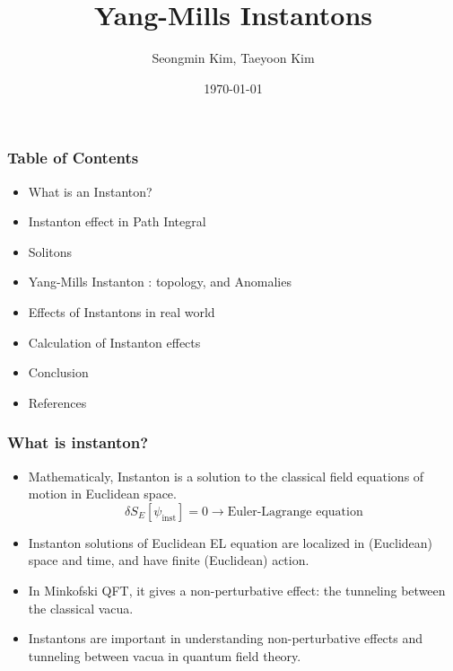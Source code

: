 \documentclass[10pt]{beamer}
\title{Yang-Mills Instantons}
\author{Seongmin Kim, Taeyoon Kim}
\institute{SNU}
\date{\today}
\begin{document}
\frame{\titlepage}

\begin{frame}
\frametitle{Table of Contents}
\begin{itemize}
\item What is an Instanton?
\item Instanton effect in Path Integral
\item Solitons
\item Yang-Mills Instanton : topology, and Anomalies
\item Effects of Instantons in real world
\item Calculation of Instanton effects
\item Conclusion
\item References
\end{itemize}
\end{frame}

\begin{frame}
\frametitle{What is instanton?}
\begin{itemize}
\item Mathematicaly, Instanton is a solution to the classical field equations of motion in Euclidean space.
\begin{equation}
    \delta S_E [\psi_{\text{inst}}] = 0 \rightarrow \text{Euler-Lagrange equation}
\end{equation}
\item Instanton solutions of Euclidean EL equation are localized in (Euclidean) space and time, and have finite (Euclidean) action.
\item In Minkofski QFT, it gives a non-perturbative effect: the tunneling between the classical vacua.
\item Instantons are important in understanding non-perturbative effects and tunneling between vacua in quantum field theory.
\end{itemize}
\end{frame}
\end{document}
